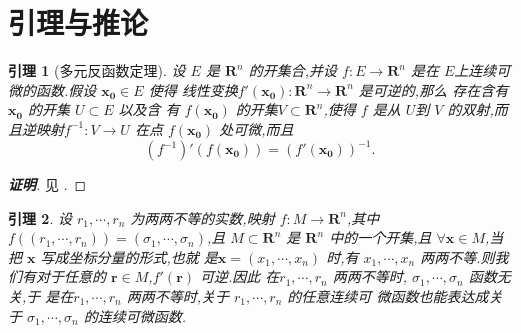 \documentclass[a4paper]{article}
\newtheorem{lemma}{引理}[section]
\begin{document}
\section{引理与推论}
\label{sec:2}
\begin{lemma}[多元反函数定理\cite{tao}]
  设 $E$ 是 $\mathbf{R}^n$ 的开集合,并设 $f:E\to
  \mathbf{R}^n$ 是在 $E$上连续可微的函数.假设 $\mathbf{x_0}\in E$ 使得
  线性变换$f'(\mathbf{x_0}):\mathbf{R}^n\to \mathbf{R}^n$ 是可逆的,那么
  存在含有$\mathbf{x_0}$ 的开集 $U\subset E$ 以及含
  有 $f(\mathbf{x_0})$ 的开集$V\subset
  \mathbf{R}^n$,使得 $f$ 是从 $U$到 $V$ 的双射,而且逆映射$f^{-1}:V\to
  U$ 在点 $f(\mathbf{x_0})$ 处可微,而且
$$
(f^{-1})'(f(\mathbf{x_0}))=(f'(\mathbf{x_0}))^{-1}.
$$
\end{lemma}
\begin{proof}[\bf{证明}]
  见 \cite{tao}.
\end{proof}
\begin{lemma}
  设 $r_1,\cdots,r_n$ 为两两不等的实数,映射 $f:M\to
  \mathbf{R}^n$,其中$f((r_1,\cdots,r_n))=(\sigma_1,\cdots,\sigma_n)$,且
  $M\subset \mathbf{R}^n$ 是 $\mathbf{R}^n$ 中的一个开集,且 $\forall
  \mathbf{x}\in M$,当把 $\mathbf{x}$ 写成坐标分量的形式,也就
  是$\mathbf{x}=(x_1,\cdots,x_n)$ 时,有 $x_1,\cdots,x_n$ 两两不等.则我
  们有对于任意的 $\mathbf{r}\in M$,$f'(\mathbf{r})$ 可逆.因此
  在$r_1,\cdots,r_n$ 两两不等时, $\sigma_1,\cdots,\sigma_n$ 函数无关,于
  是在$r_1,\cdots,r_{n}$ 两两不等时,关于 $r_1,\cdots,r_n$ 的任意连续可
  微函数也能表达成关于 $\sigma_1,\cdots,\sigma_n$ 的连续可微函数.

\end{lemma}
\end{document}
